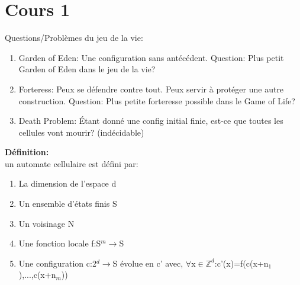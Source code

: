 \section{Cours 1}
Questions/Problèmes du jeu de la vie:
\begin{enumerate}
	\item Garden of Eden: Une configuration sans antécédent. Question: Plus petit Garden of Eden dans le jeu de la
	vie?
	\item Forteress: Peux se défendre contre tout. Peux servir à protéger une autre construction. Question: Plus petite
	forteresse possible dans le Game of Life?
	\item Death Problem: Étant donné une config initial finie, est-ce que toutes les cellules vont mourir? (indécidable)
\end{enumerate}

\textbf{Définition:\\}
un automate cellulaire est défini par:
\begin{enumerate}
	\item La dimension de l'espace d
	\item Un ensemble d'états finis S
	\item Un voisinage N
	\item Une fonction locale f:S$^m\rightarrow$S
	\item Une configuration c:2$^d\rightarrow$S évolue en c' avec,
	$\forall$x$\in\mathbb{Z}^d$:c'(x)=f(c(x+n$_1$),...,c(x+n$_m$))
\end{enumerate}
